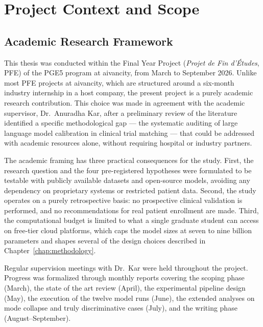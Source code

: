 
\chapter{Project Context and Scope}
\label{chap:context}

\section{Academic Research Framework}
\label{sec:ctx-framework}

This thesis was conducted within the Final Year Project (\emph{Projet de 
Fin d'\'Etudes}, PFE) of the PGE5 program at aivancity, from March to 
September 2026. Unlike most PFE projects at aivancity, which are 
structured around a six-month industry internship in a host company, the 
present project is a purely academic research contribution. This choice 
was made in agreement with the academic supervisor, Dr.\ Anuradha Kar, 
after a preliminary review of the literature identified a specific 
methodological gap --- the systematic auditing of large language model 
calibration in clinical trial matching --- that could be addressed with 
academic resources alone, without requiring hospital or industry partners.

The academic framing has three practical consequences for the study. 
First, the research question and the four pre-registered hypotheses 
were formulated to be testable with publicly available datasets and 
open-source models, avoiding any dependency on proprietary systems or 
restricted patient data. Second, the study operates on a purely 
retrospective basis: no prospective clinical validation is performed, 
and no recommendations for real patient enrollment are made. Third, the 
computational budget is limited to what a single graduate student can 
access on free-tier cloud platforms, which caps the model sizes at 
seven to nine billion parameters and shapes several of the design 
choices described in Chapter~\ref{chap:methodology}.

Regular supervision meetings with Dr.\ Kar were held throughout the 
project. Progress was formalized through monthly reports covering the 
scoping phase (March), the state of the art review (April), the 
experimental pipeline design (May), the execution of the twelve model 
runs (June), the extended analyses on mode collapse and truly 
discriminative cases (July), and the writing phase (August--September).

